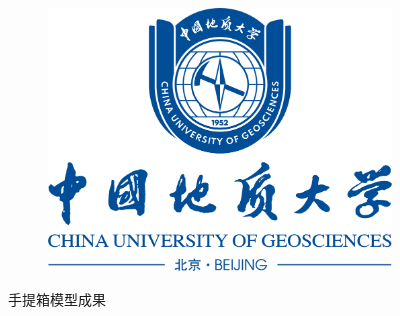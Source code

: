 \documentclass[12pt,a4paper]{article}
\begin{document}
\begin{figure}[H]
\begin{subfigure}{0.3\textwidth}
        \includegraphics[width=\linewidth]{校徽与中英文（蓝色中轴式）.png}
    \end{subfigure}
    \caption{\label{fig:boxr}手提箱模型成果}
\end{figure}
\end{document}
